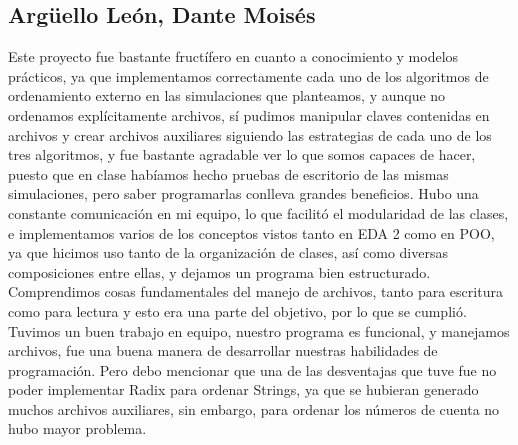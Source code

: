 \documentclass[11pt]{article}
\begin{document}
\subsection{Argüello León, Dante Moisés}
\par
Este proyecto fue bastante fructífero en cuanto a conocimiento y modelos prácticos, ya que implementamos correctamente cada uno de los algoritmos de ordenamiento externo en las simulaciones que planteamos, y aunque no ordenamos explícitamente archivos, sí pudimos manipular claves contenidas en archivos y crear archivos auxiliares siguiendo las estrategias de cada uno de los tres algoritmos, y fue bastante agradable ver lo que somos capaces de hacer, puesto que en clase habíamos hecho pruebas de escritorio de las mismas simulaciones, pero saber programarlas conlleva grandes beneficios. Hubo una constante comunicación en mi equipo, lo que facilitó el modularidad de las clases, e implementamos varios de los conceptos vistos tanto en EDA 2 como en POO, ya que hicimos uso tanto de la organización de clases, así como diversas composiciones entre ellas, y dejamos un programa bien estructurado. Comprendimos cosas fundamentales del manejo de archivos, tanto para escritura como para lectura y esto era una parte del objetivo, por lo que se cumplió. Tuvimos un buen trabajo en equipo, nuestro programa es funcional, y manejamos archivos, fue una buena manera de desarrollar nuestras habilidades de programación. Pero debo mencionar que una de las desventajas que tuve fue no poder implementar Radix para ordenar Strings, ya que se hubieran generado muchos archivos auxiliares, sin embargo, para ordenar los números de cuenta no hubo mayor problema.
\end{document}
